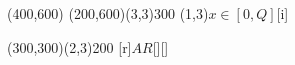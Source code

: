 \documentclass[11pt]{article}
\begin{document}
\newpage

\begin{center}
\begin{egame}(400,600)
  \putbranch(200,600)(3,3){300}
  (1,3){$x \in [0, Q]$}[i]
  
  \putbranch(300,300)(2,3){200}
  [r]{$A$}{$R$}[][]
\end{egame}
\end{center}
\end{document}
